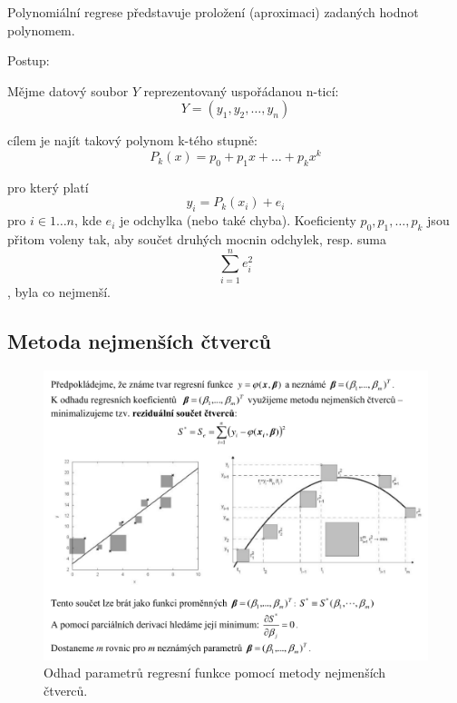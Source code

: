 \begin{compactitem}
    \item Polynomiální regrese představuje proložení (aproximaci) zadaných hodnot polynomem.

    \item Postup: \begin{compactitem}
        \item Mějme datový soubor $Y$ reprezentovaný uspořádanou n-ticí: $$Y = (y_1, y_2, \ldots, y_n)$$
        \item cílem je najít takový polynom k-tého stupně:
        $$P_k(x) = p_0 + p_1 x + \ldots + p_k x^k$$
        \item pro který platí
        $$y_i = P_k(x_i) + e_i$$
        pro $i \in 1 \ldots n$, kde $e_i$ je odchylka (nebo také chyba). Koeficienty $p_0, p_1, \ldots, p_k$ jsou přitom voleny tak, aby součet druhých mocnin odchylek, resp. suma $$\sum_{i=1}^n e_i^2$$, byla co nejmenší.
    \end{compactitem}
\end{compactitem}

\subsection{Metoda nejmenších čtverců}

\begin{figure}[H]
    \centering
    \includegraphics[width=1\linewidth]{nejmensi_ctverce.pdf}
    \caption{Odhad parametrů regresní funkce pomocí metody nejmenších čtverců.}
\end{figure}

